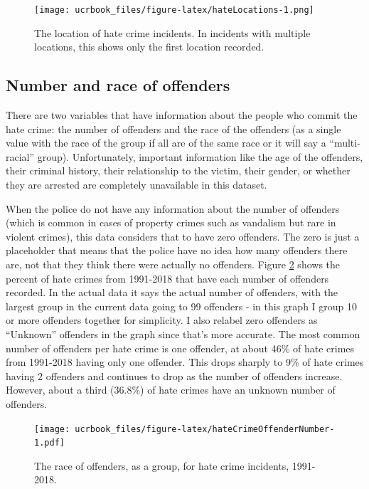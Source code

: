 \documentclass[
  12pt,
  openany]{book}
\begin{document}
\begin{figure}
\centering
\texttt{[image: ucrbook\_files/figure-latex/hateLocations-1.png]}
\caption{\label{fig:hateLocations}The location of hate crime incidents. In incidents with multiple locations, this shows only the first location recorded.}
\end{figure}

\hypertarget{number-and-race-of-offenders}{%
\subsection{Number and race of offenders}\label{number-and-race-of-offenders}}

There are two variables that have information about the people who commit the hate crime: the number of offenders and the race of the offenders (as a single value with the race of the group if all are of the same race or it will say a ``multi-racial'' group). Unfortunately, important information like the age of the offenders, their criminal history, their relationship to the victim, their gender, or whether they are arrested are completely unavailable in this dataset.

When the police do not have any information about the number of offenders (which is common in cases of property crimes such as vandalism but rare in violent crimes), this data considers that to have zero offenders. The zero is just a placeholder that means that the police have no idea how many offenders there are, not that they think there were actually no offenders. Figure \ref{fig:hateCrimeOffenderNumber} shows the percent of hate crimes from 1991-2018 that have each number of offenders recorded. In the actual data it says the actual number of offenders, with the largest group in the current data going to 99 offenders - in this graph I group 10 or more offenders together for simplicity. I also relabel zero offenders as ``Unknown'' offenders in the graph since that's more accurate. The most common number of offenders per hate crime is one offender, at about 46\% of hate crimes from 1991-2018 having only one offender. This drops sharply to 9\% of hate crimes having 2 offenders and continues to drop as the number of offenders increase. However, about a third (36.8\%) of hate crimes have an unknown number of offenders.

\begin{figure}
\centering
\texttt{[image: ucrbook\_files/figure-latex/hateCrimeOffenderNumber-1.pdf]}
\caption{\label{fig:hateCrimeOffenderNumber}The race of offenders, as a group, for hate crime incidents, 1991-2018.}
\end{figure}
\end{document}
